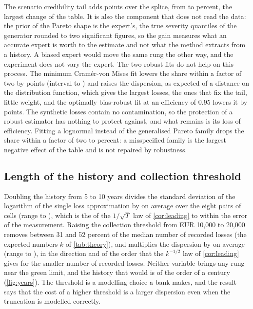 The scenario credibility tail adds \abExpertpriorDelta{} points over the splice, from \abExpertpriorFrom{} to \abExpertpriorTo{} percent, the largest change of the table. It is also the component that does not read the data: the prior of the Pareto shape is the expert's, the true severity quantiles of the generator rounded to two significant figures, so the gain measures what an accurate expert is worth to the estimate and not what the method extracts from a history. A biased expert would move the same rung the other way, and the experiment does not vary the expert.
The two robust fits do not help on this process. The minimum Cram\'er-von Mises fit lowers the share within a factor of two by \abCvmDown{} points (interval \abCvmDownLo{} to \abCvmDownHi{}) and raises the dispersion, as expected of a distance on the distribution function, which gives the largest losses, the ones that fix the tail, little weight, and the optimally bias-robust fit at an efficiency of 0.95 lowers it by \abObreDown{} points. The synthetic losses contain no contamination, so the protection of a robust estimator has nothing to protect against, and what remains is its loss of efficiency.
Fitting a lognormal instead of the generalised Pareto family drops the share within a factor of two to \abWrongfamilyTo{} percent: a misspecified family is the largest negative effect of the table and is not repaired by robustness.

\subsection{Length of the history and collection threshold}
\label{sec:abl-design}

Doubling the history from 5 to 10 years divides the standard deviation of the logarithm of the single loss approximation by \yrRatio{} on average over the eight pairs of cells (range \yrRatioMin{} to \yrRatioMax{}), which is the \sqrtTwo{} of the $1/\sqrt T$ law of \cref{cor:leading} to within the error of the measurement. Raising the collection threshold from EUR 10,000 to 20,000 removes between 31 and 52 percent of the median number of recorded losses (the expected numbers $k$ of \cref{tab:theory}), and multiplies the dispersion by \thrRatio{} on average (range \thrRatioMin{} to \thrRatioMax{}), in the direction and of the order that the $k^{-1/2}$ law of \cref{cor:leading} gives for the smaller number of recorded losses.
Neither variable brings any rung near the green limit, and the history that would is of the order of a century (\cref{fig:years}). The threshold is a modelling choice a bank makes, and the result says that the cost of a higher threshold is a larger dispersion even when the truncation is modelled correctly.

